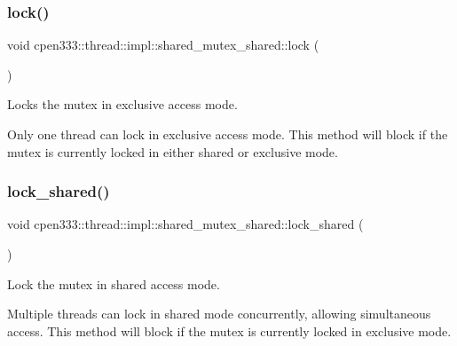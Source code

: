 \subsubsection{\texorpdfstring{lock()}{lock()}}
{\footnotesize\ttfamily void cpen333\+::thread\+::impl\+::shared\+\_\+mutex\+\_\+shared\+::lock (\begin{DoxyParamCaption}{ }\end{DoxyParamCaption})\hspace{0.3cm}{\ttfamily [inline]}}



Locks the mutex in exclusive access mode. 

Only one thread can lock in exclusive access mode. This method will block if the mutex is currently locked in either shared or exclusive mode. \mbox{\label{classcpen333_1_1thread_1_1impl_1_1shared__mutex__shared_a16b3ba22ee6190696e7c333379e786d3}} 
\subsubsection{\texorpdfstring{lock\+\_\+shared()}{lock\_shared()}}
{\footnotesize\ttfamily void cpen333\+::thread\+::impl\+::shared\+\_\+mutex\+\_\+shared\+::lock\+\_\+shared (\begin{DoxyParamCaption}{ }\end{DoxyParamCaption})\hspace{0.3cm}{\ttfamily [inline]}}



Lock the mutex in shared access mode. 

Multiple threads can lock in shared mode concurrently, allowing simultaneous access. This method will block if the mutex is currently locked in exclusive mode. \mbox{\label{classcpen333_1_1thread_1_1impl_1_1shared__mutex__shared_af7503e29c3774dad7db5c7bfffa4d6dc}} 
